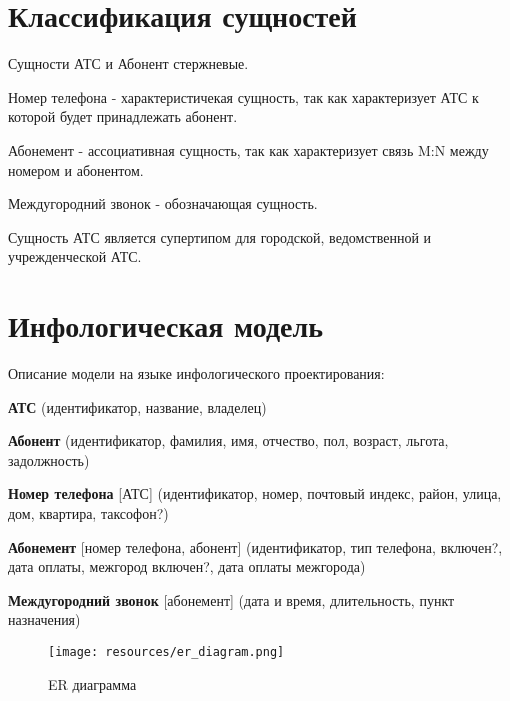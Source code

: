 \documentclass{report}
\begin{document}
\section{Классификация сущностей}

Сущности АТС и Абонент стержневые. 

Номер телефона - характеристичекая сущность, 
так как характеризует АТС к которой будет принадлежать абонент.

Абонемент - ассоциативная сущность, так как характеризует связь M:N между номером и абонентом.

Междугородний звонок - обозначающая сущность.

Сущность АТС является супертипом для городской, 
ведомственной и учрежденческой АТС.

\section{Инфологическая модель}
Описание модели на языке инфологического проектирования:

\textbf{АТС} (идентификатор, название, владелец)

\textbf{Абонент} (идентификатор, фамилия, имя, отчество, пол, 
возраст, льгота, задолжность)

\textbf{Номер телефона} [АТС] (идентификатор, номер, почтовый 
индекс, район, улица, дом, квартира, таксофон?)

\textbf{Абонемент} [номер телефона, абонент] (идентификатор, 
тип телефона, включен?, дата оплаты, межгород включен?, дата оплаты межгорода)

\textbf{Междугородний звонок} [абонемент] (дата и время, длительность, пункт назначения)


\begin{figure}[!ht]
\begin{center}
\texttt{[image: resources/er\_diagram.png]}\caption{ER диаграмма}
\end{center}
\end{figure}
\end{document}
